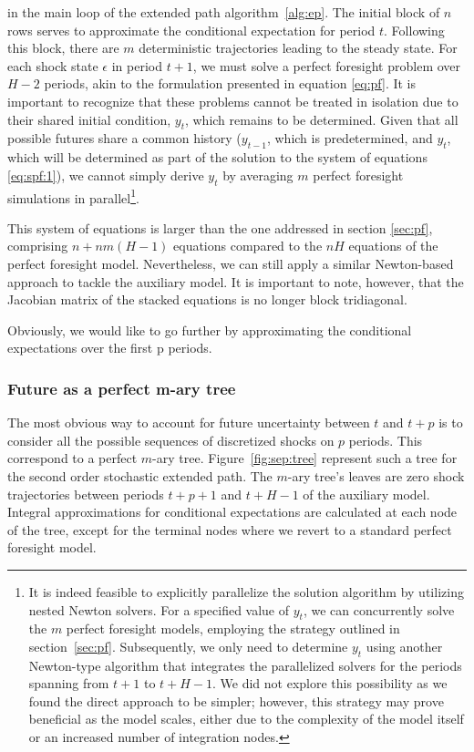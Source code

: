 \documentclass[a4paper,11pt]{amsart}
\begin{document}
in the main loop of the extended path algorithm~\ref{alg:ep}.  The
initial block of \(n\) rows serves to approximate the conditional
expectation for period \( t \). Following this block, there
are \( m \) deterministic trajectories leading to the steady
state. For each shock state \( \epsilon \) in period \( t+1 \), we
must solve a perfect foresight problem over \( H-2 \) periods, akin to
the formulation presented in equation \eqref{eq:pf}. It is important
to recognize that these problems cannot be treated in isolation due to
their shared initial condition, \(y_t\), which remains to be
determined. Given that all possible futures share a common history
($y_{t-1}$, which is predetermined, and $y_t$, which will be
determined as part of the solution to the system of equations
\eqref{eq:spf:1}), we cannot simply derive $y_t$ by averaging $m$
perfect foresight simulations in parallel\footnote{It is indeed
   feasible to explicitly parallelize the solution algorithm by
   utilizing nested Newton solvers. For a specified value of $y_t$, we
   can concurrently solve the $m$ perfect foresight models, employing
   the strategy outlined in section~\ref{sec:pf}. Subsequently, we only
   need to determine $y_t$ using another Newton-type algorithm that
   integrates the parallelized solvers for the periods spanning
   from $t+1$ to $t+H-1$. We did not explore this possibility as we
   found the direct approach to be simpler; however, this strategy may
   prove beneficial as the model scales, either due to the complexity
   of the model itself or an increased number of integration
   nodes.}.\newline

This system of equations is larger than the one addressed in section
\ref{sec:pf}, comprising \( n + nm(H-1) \) equations compared to
the \( nH \) equations of the perfect foresight model. Nevertheless,
we can still apply a similar Newton-based approach to tackle the
auxiliary model. It is important to note, however, that the Jacobian
matrix of the stacked equations is no longer block
tridiagonal.\newline

Obviously, we would like to go further by approximating the
conditional expectations over the first p periods.\newline

\subsubsection{Future as a perfect m-ary tree}\label{sec:perfect-m-ary-tree} The most obvious way to
account for future uncertainty between $t$ and $t+p$ is to consider
all the possible sequences of discretized shocks on $p$ periods. This
correspond to a perfect $m$-ary tree. Figure~\ref{fig:sep:tree}
represent such a tree for the second order stochastic extended
path. The $m$-ary tree's leaves are zero shock trajectories between
periods $t+p+1$ and $t+H-1$ of the auxiliary model. Integral
approximations for conditional expectations are calculated at each
node of the tree, except for the terminal nodes where we revert to a
standard perfect foresight model.\newline
\end{document}
